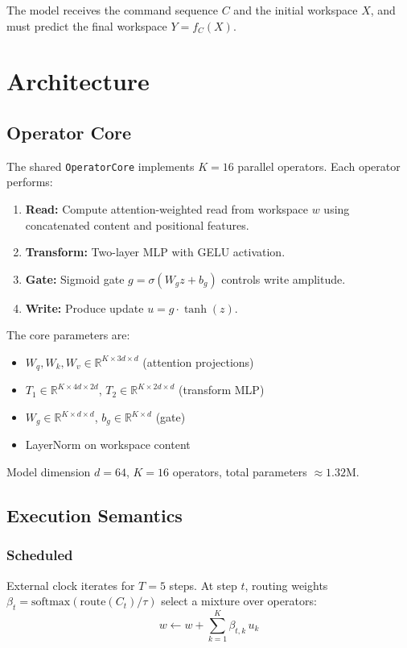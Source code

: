 \documentclass[11pt]{article}
\begin{document}
The model receives the command sequence $C$ and the initial workspace $X$, and must predict the final workspace $Y = f_C(X)$.

\section{Architecture}

\subsection{Operator Core}

The shared \texttt{OperatorCore} implements $K = 16$ parallel operators. Each operator performs:

\begin{enumerate}
    \item \textbf{Read:} Compute attention-weighted read from workspace $w$ using concatenated content and positional features.
    \item \textbf{Transform:} Two-layer MLP with GELU activation.
    \item \textbf{Gate:} Sigmoid gate $g = \sigma(W_g z + b_g)$ controls write amplitude.
    \item \textbf{Write:} Produce update $u = g \cdot \tanh(z)$.
\end{enumerate}

The core parameters are:
\begin{itemize}
    \item $W_q, W_k, W_v \in \mathbb{R}^{K \times 3d \times d}$ (attention projections)
    \item $T_1 \in \mathbb{R}^{K \times 4d \times 2d}$, $T_2 \in \mathbb{R}^{K \times 2d \times d}$ (transform MLP)
    \item $W_g \in \mathbb{R}^{K \times d \times d}$, $b_g \in \mathbb{R}^{K \times d}$ (gate)
    \item LayerNorm on workspace content
\end{itemize}

Model dimension $d = 64$, $K = 16$ operators, total parameters $\approx 1.32\text{M}$.

\subsection{Execution Semantics}

\subsubsection*{Scheduled}
External clock iterates for $T = 5$ steps. At step $t$, routing weights $\beta_t = \text{softmax}(\text{route}(C_t) / \tau)$ select a mixture over operators:
\[
w \leftarrow w + \sum_{k=1}^{K} \beta_{t,k} \, u_k
\]
\end{document}

